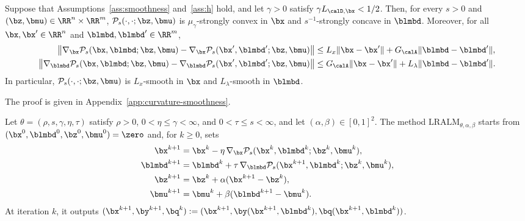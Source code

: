 \begin{proposition}
\label{prop:curvature-smoothness}
Suppose that Assumptions~\ref{ass:smoothness} and~\ref{ass:h} hold, and let
\(\gamma>0\) satisfy \(\gamma L_{\calD,\bx}<1/2\). Then, for every \(s>0\) and
\((\bz,\bmu)\in\RR^n\times\RR^m\), \(\mathcal P_s(\cdot,\cdot;\bz,\bmu)\) is
\(\mu_\gamma\)-strongly convex in \(\bx\) and \(s^{-1}\)-strongly concave in
\(\blmbd\). Moreover, for all \(\bx,\bx'\in\RR^n\) and
\(\blmbd,\blmbd'\in\RR^m\),
\begin{align}
    \bigl\|
    \nabla_{\bx}\mathcal{P}_s(\bx,\blmbd;\bz,\bmu)
    -\nabla_{\bx}\mathcal{P}_s(\bx',\blmbd';\bz,\bmu)
    \bigr\|
    &\le L_x\|\bx-\bx'\|+G_{\calA}\|\blmbd-\blmbd'\|,
    \label{eq:payoff-x-smoothness}\\
    \bigl\|
    \nabla_{\blmbd}\mathcal{P}_s(\bx,\blmbd;\bz,\bmu)
    -\nabla_{\blmbd}\mathcal{P}_s(\bx',\blmbd';\bz,\bmu)
    \bigr\|
    &\le G_{\calA}\|\bx-\bx'\|+L_\lambda\|\blmbd-\blmbd'\|.
    \label{eq:payoff-lambda-smoothness}
\end{align}
In particular, \(\mathcal P_s(\cdot,\cdot;\bz,\bmu)\) is \(L_x\)-smooth in
\(\bx\) and \(L_\lambda\)-smooth in \(\blmbd\).
\end{proposition}
The proof is given in Appendix~\ref{app:curvature-smoothness}.

\begin{definition}[LRALM]
\label{def:splalm}
Let \(\theta=(\rho,s,\gamma,\eta,\tau)\) satisfy \(\rho>0\),
\(0<\eta\le\gamma<\infty\), and \(0<\tau\le s<\infty\), and let
\((\alpha,\beta)\in[0,1]^2\). The method \(\mathrm{LRALM}_{\theta,\alpha,\beta}\)
starts from \((\bx^0,\blmbd^0,\bz^0,\bmu^0)=\zero\) and, for \(k\ge0\), sets
\begin{equation}
\begin{aligned}
    \bx^{k+1}&=\bx^k-\eta\,\nabla_{\bx}\mathcal P_s(\bx^k,\blmbd^k;\bz^k,\bmu^k),\\
    \blmbd^{k+1}&=\blmbd^k+\tau\,\nabla_{\blmbd}\mathcal P_s(\bx^{k+1},\blmbd^k;\bz^k,\bmu^k),\\
    \bz^{k+1}&=\bz^k+\alpha(\bx^{k+1}-\bz^k),\\
    \bmu^{k+1}&=\bmu^k+\beta(\blmbd^{k+1}-\bmu^k).
\end{aligned}
    \label{eq:splalm-updates}
\end{equation}
At iteration \(k\), it outputs
\((\bx^{k+1},\by^{k+1},\bq^k)
:=(\bx^{k+1},\by(\bx^{k+1},\blmbd^k),\bq(\bx^{k+1},\blmbd^k))\).
\end{definition}

